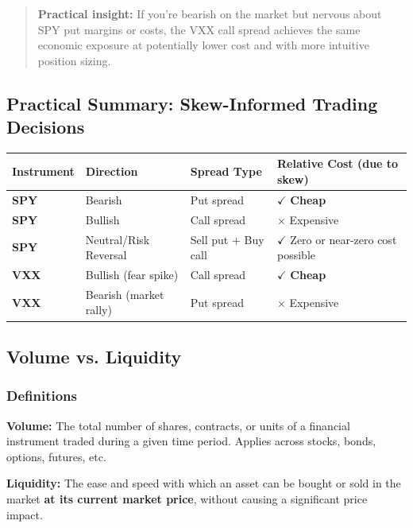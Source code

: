 \documentclass[12pt,openany]{book}
\begin{document}
\begin{quote}
\textbf{Practical insight:} If you're bearish on the market but nervous about SPY put margins or costs, the VXX call spread achieves the same economic exposure at potentially lower cost and with more intuitive position sizing.
\end{quote}

\subsection{Practical Summary: Skew-Informed Trading Decisions}

\begin{center}
\scriptsize
\setlength{\tabcolsep}{3pt}
\begin{tabular}{|L{3.0cm}|L{3.0cm}|L{3.0cm}|L{3.0cm}|}
\hline
\textbf{Instrument} & \textbf{Direction} & \textbf{Spread Type} & \textbf{Relative Cost (due to skew)} \\
\hline
\textbf{SPY} & Bearish & Put spread & \(\checkmark\) \textbf{Cheap} \\
\hline
\textbf{SPY} & Bullish & Call spread & \(\times\) Expensive \\
\hline
\textbf{SPY} & Neutral/Risk Reversal & Sell put + Buy call & \(\checkmark\) Zero or near-zero cost possible \\
\hline
\textbf{VXX} & Bullish (fear spike) & Call spread & \(\checkmark\) \textbf{Cheap} \\
\hline
\textbf{VXX} & Bearish (market rally) & Put spread & \(\times\) Expensive \\
\hline
\end{tabular}
\end{center}

\subsection{Volume vs. Liquidity}

\subsubsection{Definitions}

\textbf{Volume:}
The total number of shares, contracts, or units of a financial instrument traded during a given time period. Applies across stocks, bonds, options, futures, etc.

\textbf{Liquidity:}
The ease and speed with which an asset can be bought or sold in the market \textbf{at its current market price}, without causing a significant price impact.
\end{document}
